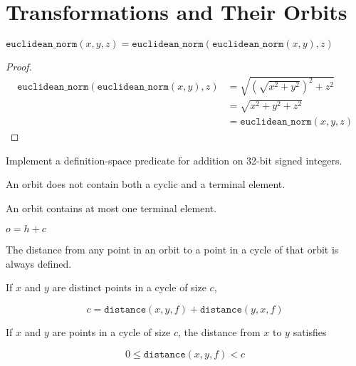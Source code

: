 
\chapter{Transformations and Their Orbits}

\begin{lemma}
	$\mathtt{euclidean\_norm}(x, y, z) = \mathtt{euclidean\_norm}(\mathtt{euclidean\_norm}(x, y), z)$
\end{lemma}

\begin{proof}
	\begin{align*}
		\mathtt{euclidean\_norm}(\mathtt{euclidean\_norm}(x, y), z)
		&= \sqrt{\left (\sqrt{x^2 + y^2} \right )^2 + z^2}\\
		&= \sqrt{x^2 + y^2 + z^2}\\
		&= \mathtt{euclidean\_norm}(x, y, z)
	\end{align*}
\end{proof}

\begin{exercise}
	Implement a definition-space predicate for addition on 32-bit signed integers.
\end{exercise}



\begin{lemma}
	An orbit does not contain both a cyclic and a terminal element.
\end{lemma}

\begin{lemma}
	An orbit contains at most one terminal element.
\end{lemma}

\begin{lemma}
	$o = h + c$
\end{lemma}

\begin{lemma}
	The distance from any point in an orbit to a point in a cycle
	of that orbit is always defined.
\end{lemma}

\begin{lemma}
	If $x$ and $y$ are distinct points in a cycle of size $c$,
	
	\[ c = \mathtt{distance}(x, y, f) + \mathtt{distance}(y, x, f) \]
\end{lemma}

\begin{lemma}
	If $x$ and $y$ are points in a cycle of size $c$, the distance from $x$
	to $y$ satisfies

	\[ 0 \leq \mathtt{distance}(x, y, f) < c \]
\end{lemma}

